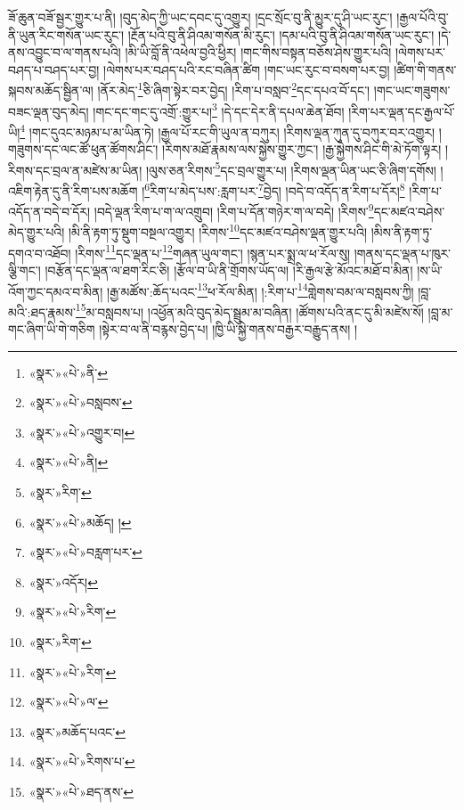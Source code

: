 ཟོ་ཆུན་བཟོ་སྦྱར་གྱུར་པ་ནི། །བུད་མེད་ཀྱི་ཡང་དབང་དུ་འགྱུར། །དྲང་སྲོང་བུ་ནི་མྱུར་དུ་ཤི་ཡང་རུང་། །རྒྱལ་པོའི་བུ་ནི་ཡུན་རིང་གསོན་ཡང་རུང་། །རྔོན་པའི་བུ་ནི་ཤིའམ་གསོན་མི་རུང་། །དམ་པའི་བུ་ནི་ཤིའམ་གསོན་ཡང་རུང་། །དེ་ནས་འབྱུང་བ་ལ་གནས་པའི། །མི་ཡི་བློ་ནི་འཕེལ་བྱའི་ཕྱིར། །གང་གིས་བསྟན་བཅོས་ཤེས་གྱུར་པའི། །ལེགས་པར་བཤད་པ་བཤད་པར་བྱ། །ལེགས་པར་བཤད་པའི་རང་བཞིན་ཚིག །གང་ཡང་རུང་བ་བསག་པར་བྱ། །ཚིག་གི་གནས་སྐབས་མཆོད་སྦྱིན་ལ། །ནོར་མེད་\footnote{«སྣར་»«པེ་»ནི་}ཅི་ཞིག་སྟེར་བར་བྱེད། །རིག་པ་བསླབ་\footnote{«སྣར་»«པེ་»བསླབས་}དང་དཔའ་བོ་དང་། །གང་ཡང་གཟུགས་བཟང་ལྡན་བུད་མེད། །གང་དང་གང་དུ་འགྲོ་:གྱུར་པ།\footnote{«སྣར་»«པེ་»འགྱུར་བ།} །དེ་དང་དེར་ནི་དཔལ་ཆེན་ཐོབ། །རིག་པར་ལྡན་དང་རྒྱལ་པོ་ཡི།\footnote{«སྣར་»«པེ་»ནི།} །གང་དུའང་མཉམ་པ་མ་ཡིན་ཏེ། །རྒྱལ་པོ་རང་གི་ཡུལ་ན་བཀུར། །རིགས་ལྡན་ཀུན་དུ་བཀུར་བར་འགྱུར། །གཟུགས་དང་ལང་ཚོ་ཕུན་ཚོགས་ཤིང་། །རིགས་མཐོ་རྣམས་ལས་སྐྱེས་གྱུར་ཀྱང་། །རྒྱ་སྐྱེགས་ཤིང་གི་མེ་ཏོག་ལྟར། །རིགས་དང་བྲལ་ན་མཛེས་མ་ཡིན། །ལུས་ཅན་རིགས་\footnote{«སྣར་»རིག་}དང་བྲལ་གྱུར་པ། །རིགས་ལྡན་ཡིན་ཡང་ཅི་ཞིག་དགོས། །འཇིག་རྟེན་དུ་ནི་རིག་པས་མཆོག །\footnote{«སྣར་»«པེ་»མཆོད། །}རིག་པ་མེད་པས་:རླག་པར་\footnote{«སྣར་»«པེ་»བརླག་པར་}བྱེད། །བདེ་བ་འདོད་ན་རིག་པ་དོར།\footnote{«སྣར་»འདོར།} །རིག་པ་འདོད་ན་བདེ་བ་དོར། །བདེ་ལྡན་རིག་པ་ག་ལ་འགྲུབ། །རིག་པ་དོན་གཉེར་ག་ལ་བདེ། །རིགས་\footnote{«སྣར་»«པེ་»རིག་}དང་མཛའ་བཤེས་མེད་གྱུར་པའི། །མི་ནི་རྟག་ཏུ་སྡུག་བསྔལ་འགྱུར། །རིགས་\footnote{«སྣར་»རིག་}དང་མཛའ་བཤེས་ལྡན་གྱུར་པའི། །མིས་ནི་རྟག་ཏུ་དགའ་བ་འཐོབ། །རིགས་\footnote{«སྣར་»«པེ་»རིག་}དང་ལྡན་པ་\footnote{«སྣར་»«པེ་»ལ་}གཞན་ཡུལ་གང་། །སྙན་པར་སྨྲ་ལ་ཕ་རོལ་སུ། །གནས་དང་ལྡན་པ་ཁུར་ལྕི་གང་། །བརྩོན་དང་ལྡན་ལ་ཐག་རིང་ཅི། །རྩོལ་བ་ཡི་ནི་གྲོགས་ཡོད་ལ། །རི་རྒྱལ་རྩེ་མོའང་མཐོ་བ་མིན། །ས་ཡི་འོག་ཀྱང་དམའ་བ་མིན། །རྒྱ་མཚོས་:ཆོད་པའང་\footnote{«སྣར་»མཆོད་པའང་}ཕ་རོལ་མིན། །:རིག་པ་\footnote{«སྣར་»«པེ་»རིགས་པ་}གླེགས་བམ་ལ་བསླབས་ཀྱི། །བླ་མའི་:ཐད་རྣམས་\footnote{«སྣར་»«པེ་»ཐད་ནས་}མ་བསླབས་པ། །འཕྱོན་མའི་བུད་མེད་སྦྲུམ་མ་བཞིན། །ཚོགས་པའི་ནང་དུ་མི་མཛེས་སོ། །བླ་མ་གང་ཞིག་ཡི་གེ་གཅིག །སྟེར་བ་ལ་ནི་བརྙས་བྱེད་པ། །ཁྱི་ཡི་སྐྱེ་གནས་བརྒྱར་བརྒྱུད་ནས། །
